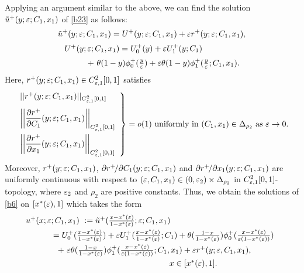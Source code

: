 \documentclass[a4,10pt]{article}
\begin{document}
Applying an argument similar to the above, we can find the solution 
$\tilde{u}^+(y;\varepsilon;C_1,x_1)$ of \eqref{b23} as follows:
$$  
\tilde{u}^+(y;\varepsilon;C_1,x_1)  =  U^+(y;\varepsilon;C_1,x_1) + \varepsilon r^+(y;\varepsilon;C_1,x_1), 
$$
%
\begin{equation}\label{any1}
\begin{array}{l}
U^+(y;\varepsilon;C_1,x_1) =  U^+_0(y) + \varepsilon U^+_1(y;C_1)  \hspace*{1cm} \\[0.2cm]
\hspace*{1cm}+ \ \theta(1-y)\phi^+_0( \frac{y}{\varepsilon}) 
+  \varepsilon \theta(1-y)\phi^+_1(  \frac{y}{\varepsilon};C_1,x_1 ). 
\end{array}
\end{equation}
%
Here, $r^+(y;\varepsilon;C_1,x_1) \in C^2_{\varepsilon,1}[0,1]$ satisfies 
\begin{equation*}
\left. 
\begin{array}{l}
 ||r^+(y;\ep;C_1,x_1) ||_{C^2_{\ep,1}[0,1]} \\[2ex]
\displaystyle{ \left|\left| \frac {\partial r^+}{\partial C_1}(y;\ep;C_1,x_1) \right|\right|_{C^2_{\ep,1}[0,1] }} \\[3ex]
\displaystyle{ \left|\left| \frac {\partial r^+}{\partial x_1}(y;\ep;C_1,x_1) \right|\right|_{C^2_{\ep,1}[0,1] }}
\end{array} 
\right\}
= o(1) \  \mbox{uniformly in} \ (C_1,x_1) \in \Delta_{\rho_2} \ \mbox{as} \ \ep \to 0. 
\end{equation*}
%
Moreover, 
$r^+(y;\varepsilon;C_1,x_1)$, $\partial r^+ \! /\partial C_1(y;\varepsilon;C_1,x_1)$ and $\partial r^+ \! /\partial x_1(y;\varepsilon;C_1,x_1)$ are uniformly continuous with respect to $(\varepsilon,C_1,x_1) \in (0, \varepsilon_2) \times \Delta_{\rho_2}$
in $C^2_{\varepsilon,1}[0,1]$-topology, 
where $\varepsilon_2$ and $\rho_2$ are positive constants. 
Thus, we obtain the solutions of \eqref{b6} on $[x^*(\varepsilon), 1]$ which takes the form 
%
%
%
%
\begin{equation}\label{b35}
\begin{array}{l}
\! \! \! u^+(x ; \ep;C_1,x_1)  \ :=  \tilde{u}^+(\frac{x-x^*(\ep)}{1- x^*(\ep)}; \ep;C_1,x_1) \\[1ex]
\hspace*{1cm}  = 
U^+_0( \frac{x-x^*(\ep)}{1- x^*(\ep)}) + \ep U^+_1(\frac{x-x^*(\ep)}{1- x^*(\ep)};C_1) + \theta(\frac{1-x}{1- x^*(\ep)}) \phi^+_0( \frac{x-x^*(\ep)}{\ep(1- x^*(\ep))}) 
 \\[1ex]
\hspace{1.2cm} 
+ \ \ep \theta(\frac{1-x}{1- x^*(\ep)}) \phi^+_1(  \frac{x-x^*(\ep)}{\ep(1- x^*(\ep))};C_1,x_1) + \ep r^+(y;\ep,C_1,x_1), \\[1ex]
\hspace*{6cm} x \in [x^*(\ep), 1]. 
\end{array}
\end{equation}
%
%
\end{document}
